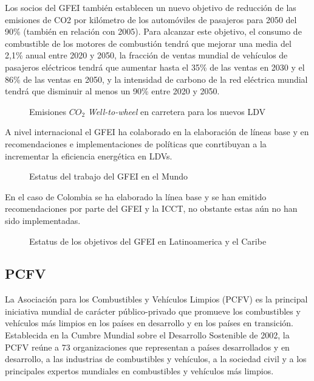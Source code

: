 Los socios del GFEI también establecen un nuevo objetivo de reducción de las emisiones de CO2 por kilómetro de los automóviles de pasajeros para 2050 del 90\% (también en relación con 2005). Para alcanzar este objetivo, el consumo de combustible de los motores de combustión tendrá que mejorar una media del 2,1\% anual entre 2020 y 2050, la fracción de ventas mundial de vehículos de pasajeros eléctricos tendrá que aumentar hasta el 35\% de las ventas en 2030 y el 86\% de las ventas en 2050, y la intensidad de carbono de la red eléctrica mundial tendrá que disminuir al menos un 90\% entre 2020 y 2050. \cite{Prospects_GFEI}

 \begin{figure}[htbp]
   \centering
   
    \caption{Emisiones $CO_2$ \textit{Well-to-wheel} en carretera para los nuevos LDV \cite{Prospects_GFEI}}
    \label{fig:prospects-GFEI}
\end{figure}

A nivel internacional el GFEI ha colaborado en la elaboración de líneas base y en recomendaciones e implementaciones de políticas que conrtibuyan a la incrementar la eficiencia energética en LDVs.

 \begin{figure}[htbp]
   \centering
   
    \caption{Estatus del trabajo del GFEI en el Mundo \cite{GlobalStatus_GFEI}}
    \label{fig:statusworld-GFEI}
\end{figure}


En el caso de Colombia se ha elaborado la línea base y se han emitido recomendaciones por parte del GFEI y la ICCT, no obstante estas aún no han sido implementadas.

 \begin{figure}[htbp]
   \centering
   
    \caption{Estatus de los objetivos del GFEI en Latinoamerica y el Caribe \cite{GlobalStatus_GFEI}}
    \label{fig:statuslatam-GFEI}
\end{figure}

\subsection{PCFV}

La Asociación para los Combustibles y Vehículos Limpios (PCFV) es la principal iniciativa mundial de carácter público-privado que promueve los combustibles y vehículos más limpios en los países en desarrollo y en los países en transición. Establecida en la Cumbre Mundial sobre el Desarrollo Sostenible de 2002, la PCFV reúne a 73 organizaciones que representan a países desarrollados y en desarrollo, a las industrias de combustibles y vehículos, a la sociedad civil y a los principales expertos mundiales en combustibles y vehículos más limpios. \cite{Vehicles_PCFV}

